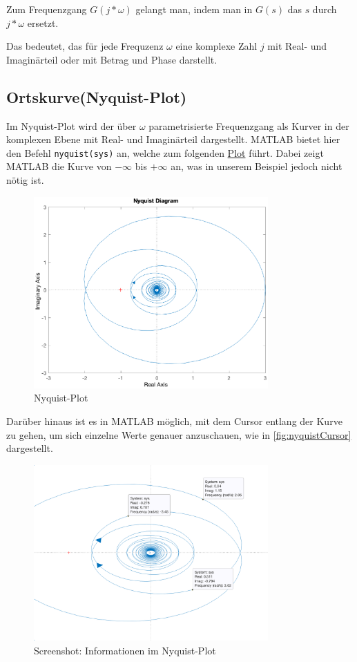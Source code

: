 Zum Frequenzgang $G(j * \omega)$ gelangt man, indem man in $G(s)$ das $s$ durch $j * \omega$ ersetzt.

Das bedeutet, das für jede Frequzenz $\omega$ eine komplexe Zahl $j$ mit Real- und Imaginärteil oder mit Betrag und Phase darstellt.

\subsection{Ortskurve(Nyquist-Plot)}
Im Nyquist-Plot wird der über $\omega$ parametrisierte Frequenzgang als Kurver in der komplexen Ebene mit Real- und Imaginärteil dargestellt.
MATLAB bietet hier den Befehl \texttt{nyquist(sys)} an, welche zum folgenden \hyperref[fig:nyquist]{Plot} führt. Dabei zeigt MATLAB die Kurve von $-\infty$ bis $+\infty$ an, was in unserem Beispiel jedoch nicht nötig ist.

\begin{figure}[H]
    \label{fig:nyquist}
    \centering
    \includegraphics[width=0.8\textwidth]{Bilder/NyquistPT1Tt.eps}
    \caption{Nyquist-Plot}
 \end{figure}

 Darüber hinaus ist es in MATLAB möglich, mit dem Cursor entlang der Kurve zu gehen, um sich einzelne Werte genauer anzuschauen, wie in \autoref{fig:nyquistCursor} dargestellt.

 \begin{figure}[H]
    \label{fig:nyquistCursor}
    \centering
    \includegraphics[width=0.8\textwidth]{Bilder/NyquistCursorPT1Tt.png}
    \caption{Screenshot: Informationen im Nyquist-Plot}
 \end{figure}

